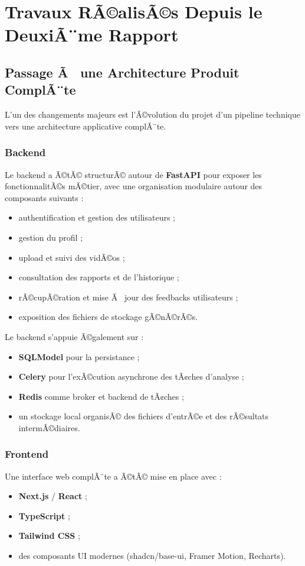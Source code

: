﻿\documentclass[12pt,a4paper]{article}
\begin{document}
\section{Travaux RÃ©alisÃ©s Depuis le DeuxiÃ¨me Rapport}

\subsection{Passage Ã  une Architecture Produit ComplÃ¨te}
L'un des changements majeurs est l'Ã©volution du projet d'un pipeline technique vers une architecture applicative complÃ¨te.

\subsubsection{Backend}
Le backend a Ã©tÃ© structurÃ© autour de \textbf{FastAPI} \cite{fastapi} pour exposer les fonctionnalitÃ©s mÃ©tier, avec une organisation modulaire autour des composants suivants :
\begin{itemize}
    \item authentification et gestion des utilisateurs ;
    \item gestion du profil ;
    \item upload et suivi des vidÃ©os ;
    \item consultation des rapports et de l'historique ;
    \item rÃ©cupÃ©ration et mise Ã  jour des feedbacks utilisateurs ;
    \item exposition des fichiers de stockage gÃ©nÃ©rÃ©s.
\end{itemize}

Le backend s'appuie Ã©galement sur :
\begin{itemize}
    \item \textbf{SQLModel} pour la persistance ;
    \item \textbf{Celery} \cite{celery} pour l'exÃ©cution asynchrone des tÃ¢ches d'analyse ;
    \item \textbf{Redis} comme broker et backend de tÃ¢ches ;
    \item un stockage local organisÃ© des fichiers d'entrÃ©e et des rÃ©sultats intermÃ©diaires.
\end{itemize}

\subsubsection{Frontend}
Une interface web complÃ¨te a Ã©tÃ© mise en place avec :
\begin{itemize}
    \item \textbf{Next.js} \cite{nextjs} / \textbf{React} \cite{react} ;
    \item \textbf{TypeScript} ;
    \item \textbf{Tailwind CSS} ;
    \item des composants UI modernes (shadcn/base-ui, Framer Motion, Recharts).
\end{itemize}
\end{document}
